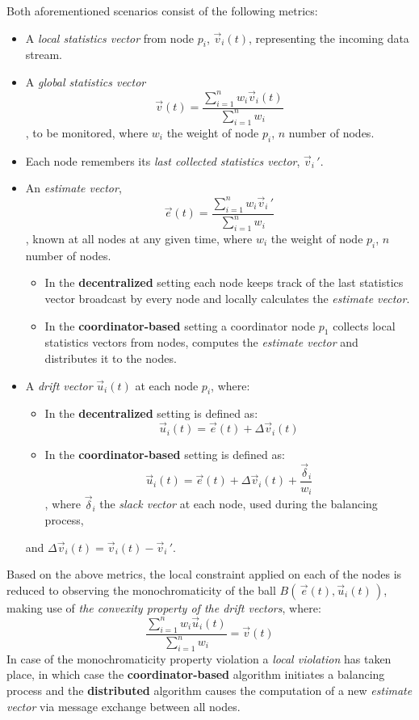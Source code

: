 \documentclass{article}
\begin{document}
			Both aforementioned scenarios consist of the following metrics:
		\begin{itemize}
			\item A \emph{local statistics vector} from node $p_i$, $\vec{v}_i(t)$, representing the incoming data stream.
			\item A \emph{global statistics vector} $$\vec{v}(t)= \dfrac{\sum\limits_{i=1}^{n}{w_i \vec{v}_i(t)}}{\sum\limits_{i=1}^{n}{w_i}}$$, to be monitored, where $w_i$ the weight of node $p_i$, $n$ number of nodes.
			\item Each node remembers its \emph{last collected statistics vector}, $\vec{v}_i\,'$.
			\item An \emph{estimate vector}, $$\vec{e}(t)= \dfrac{\sum\limits_{i=1}^{n}{w_i \vec{v}_i\,'}}{\sum\limits_{i=1}^{n}{w_i}}$$, known at all nodes at any given time, where $w_i$ the weight of node $p_i$, $n$ number of nodes.
			\begin{itemize}
				\item In the \textbf{decentralized} setting each node keeps track of the last statistics vector broadcast by every node and locally calculates the \emph{estimate vector}.
				\item In the \textbf{coordinator-based} setting a coordinator node $p_1$ collects local statistics vectors from nodes, computes the \emph{estimate vector} and distributes it to the nodes.
			\end{itemize}
			\item A \emph{drift vector} $\vec{u}_i(t)$ at each node $p_i$, where:
			\begin{itemize}
				\item In the \textbf{decentralized} setting is defined as: $$\vec{u}_i(t)=\vec{e}(t)+\Delta \vec{v}_i(t)$$
				\item In the \textbf{coordinator-based} setting is defined as:
$${\vec{u}_i(t)=\vec{e}(t)+\Delta\vec{v}_i(t)+\dfrac{\vec{\delta}_i}{w_i}}$$, where $\vec{\delta}_i$ the \emph{slack vector} at each node, used during the balancing process,
			\end{itemize}
			and $\Delta\vec{v}_i(t)=\vec{v}_i(t)-\vec{v}_i\,'$.
		\end{itemize}
		
			Based on the above metrics, the local constraint applied on each of the nodes is reduced to observing the  monochromaticity of the ball $B\left(\,\vec{e}(t),\vec{u}_i(t)\,\right)$, making use of \textit{the convexity property of the drift vectors}, where: $$\dfrac{\sum\limits_{i=1}^{n}{w_i \vec{u}_i(t)}}{\sum\limits_{i=1}^{n}{w_i}}=\vec{v}(t)$$ In case of the monochromaticity property violation a \emph{local violation} has taken place, in which case the \textbf{coordinator-based} algorithm initiates a balancing process and the \textbf{distributed} algorithm causes the computation of a new \emph{estimate vector} via message exchange between all nodes.
		
\end{document}
